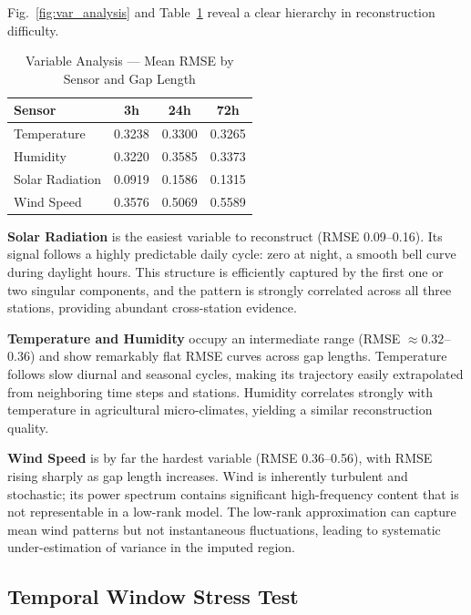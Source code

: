 \documentclass[conference]{IEEEtran}
\begin{document}
Fig.~\ref{fig:var_analysis} and Table~\ref{tab:varanalysis} reveal a clear hierarchy in reconstruction difficulty.

\begin{table}[h]
\caption{Variable Analysis — Mean RMSE by Sensor and Gap Length}
\label{tab:varanalysis}
\centering
\begin{tabular}{lccc}
\toprule
\textbf{Sensor} & \textbf{3h} & \textbf{24h} & \textbf{72h} \\
\midrule
Temperature     & 0.3238 & 0.3300 & 0.3265 \\
Humidity        & 0.3220 & 0.3585 & 0.3373 \\
Solar Radiation & 0.0919 & 0.1586 & 0.1315 \\
Wind Speed      & 0.3576 & 0.5069 & 0.5589 \\
\bottomrule
\end{tabular}
\end{table}

\textbf{Solar Radiation} is the easiest variable to reconstruct (RMSE 0.09–0.16). Its signal follows a highly predictable daily cycle: zero at night, a smooth bell curve during daylight hours. This structure is efficiently captured by the first one or two singular components, and the pattern is strongly correlated across all three stations, providing abundant cross-station evidence.

\textbf{Temperature and Humidity} occupy an intermediate range (RMSE $\approx 0.32$–$0.36$) and show remarkably flat RMSE curves across gap lengths. Temperature follows slow diurnal and seasonal cycles, making its trajectory easily extrapolated from neighboring time steps and stations. Humidity correlates strongly with temperature in agricultural micro-climates, yielding a similar reconstruction quality.

\textbf{Wind Speed} is by far the hardest variable (RMSE 0.36–0.56), with RMSE rising sharply as gap length increases. Wind is inherently turbulent and stochastic; its power spectrum contains significant high-frequency content that is not representable in a low-rank model. The low-rank approximation can capture mean wind patterns but not instantaneous fluctuations, leading to systematic under-estimation of variance in the imputed region.

\subsection{Temporal Window Stress Test}
\end{document}
